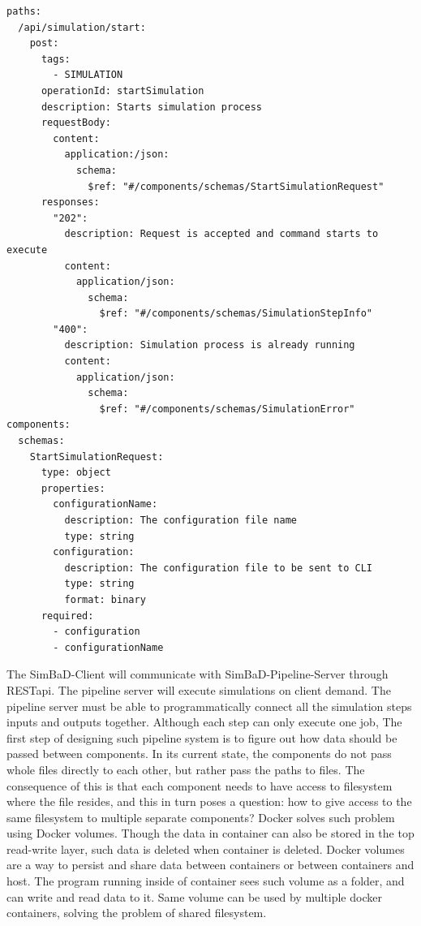 \begin{lstlisting}[label=list:openapi-route,caption=The OpenAPI route definition for simulation start, basicstyle=\footnotesize\ttfamily]
paths:
  /api/simulation/start:
    post:
      tags:
        - SIMULATION
      operationId: startSimulation
      description: Starts simulation process
      requestBody:
        content:
          application:/json:
            schema:
              $ref: "#/components/schemas/StartSimulationRequest"
      responses:
        "202":
          description: Request is accepted and command starts to execute
          content:
            application/json:
              schema:
                $ref: "#/components/schemas/SimulationStepInfo"
        "400":
          description: Simulation process is already running
          content:
            application/json:
              schema:
                $ref: "#/components/schemas/SimulationError"
components:
  schemas:
    StartSimulationRequest:
      type: object
      properties:
        configurationName:
          description: The configuration file name
          type: string
        configuration:
          description: The configuration file to be sent to CLI
          type: string
          format: binary
      required:
        - configuration
        - configurationName
\end{lstlisting}
The SimBaD-Client will communicate with SimBaD-Pipeline-Server through RESTapi. The pipeline server will execute simulations on client demand. The pipeline server must be able to programmatically connect all the simulation steps inputs and outputs together. Although each step can only execute one job, 
The first step of designing such pipeline system is to figure out how data should be passed between components. In its current state, the components do not pass whole files directly to each other, but rather pass the paths to files. The consequence of this is that each component needs to have access to filesystem where the file resides, and this in turn poses a question: how to give access to the same filesystem to multiple separate components? Docker solves such problem using Docker volumes.  Though the data in container can also be stored in the top read-write layer, such data is deleted when container is deleted. Docker volumes are a way to persist and share data between containers or between containers and host. The program running inside of container sees such volume as a folder, and can write and read data to it. Same volume can be used by multiple docker containers, solving the problem of shared filesystem.
